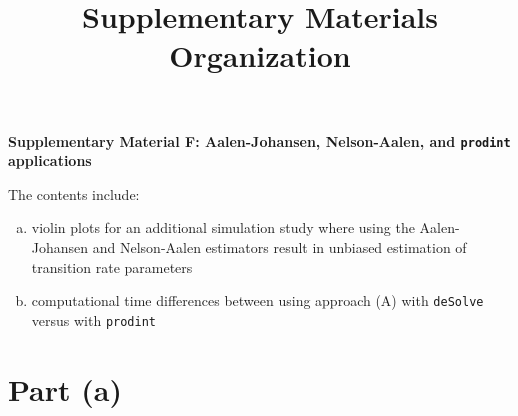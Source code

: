 \documentclass{article}
\title{Supplementary Materials Organization}
\date{\vspace{-5ex}}
\begin{document}
\noindent \textbf{\LARGE Supplementary Material F: Aalen-Johansen, Nelson-Aalen, and \texttt{prodint} applications}\\
\vspace{0.25in}

\noindent The contents include: 
\begin{enumerate}[(a)]
\item violin plots for an additional simulation study where using the Aalen-Johansen and Nelson-Aalen estimators result in unbiased estimation of transition rate parameters
\item computational time differences between using approach (A) with \texttt{deSolve} versus with \texttt{prodint}
\end{enumerate}
\vspace{0.25in}

\section*{Part (a)}

\newpage
\end{document}
